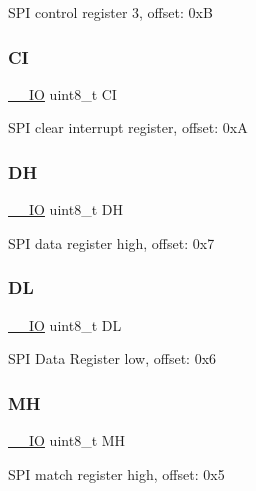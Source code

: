 S\+PI control register 3, offset\+: 0xB \mbox{\label{struct_s_p_i___type_a247a9bdfd7730b209d0eb1a9d5ef6a8f}} 
\subsubsection{\texorpdfstring{CI}{CI}}
{\footnotesize\ttfamily \mbox{\hyperlink{core__cm0plus_8h_aec43007d9998a0a0e01faede4133d6be}{\+\_\+\+\_\+\+IO}} uint8\+\_\+t CI}

S\+PI clear interrupt register, offset\+: 0xA \mbox{\label{struct_s_p_i___type_ab50f078a2c98c9d728f29125df6032cb}} 
\subsubsection{\texorpdfstring{DH}{DH}}
{\footnotesize\ttfamily \mbox{\hyperlink{core__cm0plus_8h_aec43007d9998a0a0e01faede4133d6be}{\+\_\+\+\_\+\+IO}} uint8\+\_\+t DH}

S\+PI data register high, offset\+: 0x7 \mbox{\label{struct_s_p_i___type_ac1e77cf0d67fe29fd8a408d0ade2dd04}} 
\subsubsection{\texorpdfstring{DL}{DL}}
{\footnotesize\ttfamily \mbox{\hyperlink{core__cm0plus_8h_aec43007d9998a0a0e01faede4133d6be}{\+\_\+\+\_\+\+IO}} uint8\+\_\+t DL}

S\+PI Data Register low, offset\+: 0x6 \mbox{\label{struct_s_p_i___type_aea2fccc9fc351b426a4d0789546eaa88}} 
\subsubsection{\texorpdfstring{MH}{MH}}
{\footnotesize\ttfamily \mbox{\hyperlink{core__cm0plus_8h_aec43007d9998a0a0e01faede4133d6be}{\+\_\+\+\_\+\+IO}} uint8\+\_\+t MH}

S\+PI match register high, offset\+: 0x5 \mbox{\label{struct_s_p_i___type_a5f8b81ae482da669eb9402d4b7db9093}} 
